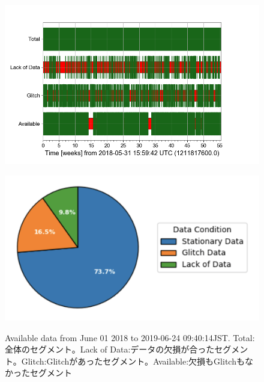 \begin{figure}[H]
  \begin{minipage}[b]{0.65\hsize}
    \includegraphics[width=18.0cm]{./img_chap3/img317.png}
    \label{img:img317_a}
  \end{minipage}
  \begin{minipage}[b]{0.65\hsize}
    \centering              
    \includegraphics[width=13.0cm]{./img_chap3/img323.png}
    \label{img:img317_b}
  \end{minipage}
  \caption{Available data from June 01 2018 to 2019-06-24 09:40:14JST. Total:全体のセグメント。Lack of Data:データの欠損が合ったセグメント。Glitch:Glitchがあったセグメント。Available:欠損もGlitchもなかったセグメント}\label{img:img317}
\end{figure}

